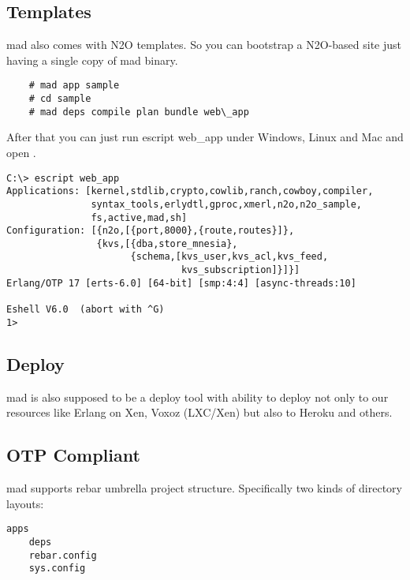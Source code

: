 \subsection{Templates}

mad also comes with N2O templates. So you can bootstrap a N2O-based site
just having a single copy of mad binary.

\vspace{1\baselineskip}
\begin{lstlisting}
    # mad app sample
    # cd sample
    # mad deps compile plan bundle web\_app
\end{lstlisting}
\vspace{1\baselineskip}

After that you can just run escript web\_app under Windows, Linux and
Mac and open .

\vspace{1\baselineskip}
\begin{lstlisting}
C:\> escript web_app
Applications: [kernel,stdlib,crypto,cowlib,ranch,cowboy,compiler,
               syntax_tools,erlydtl,gproc,xmerl,n2o,n2o_sample,
               fs,active,mad,sh]
Configuration: [{n2o,[{port,8000},{route,routes}]},
                {kvs,[{dba,store_mnesia},
                      {schema,[kvs_user,kvs_acl,kvs_feed,
                               kvs_subscription]}]}]
Erlang/OTP 17 [erts-6.0] [64-bit] [smp:4:4] [async-threads:10]

Eshell V6.0  (abort with ^G)
1>
\end{lstlisting}
\vspace{1\baselineskip}

\subsection{Deploy}

mad is also supposed to be a deploy tool with ability to
deploy not only to our resources like Erlang on Xen, Voxoz (LXC/Xen) but
also to Heroku and others.

\subsection{OTP Compliant}

mad supports rebar umbrella project structure.
Specifically two kinds of directory layouts:

\begin{lstlisting}[caption=Solution]
    apps
    deps
    rebar.config
    sys.config
\end{lstlisting}

